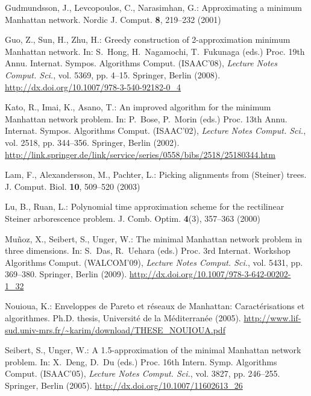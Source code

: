 \documentclass[11pt]{llncs}
\begin{document}
\begin{thebibliography}{10}
Gudmundsson, J., Levcopoulos, C., Narasimhan, G.: Approximating a minimum
  {Manhattan} network.
\newblock Nordic J. Comput. \textbf{8}, 219--232 (2001)

Guo, Z., Sun, H., Zhu, H.: Greedy construction of 2-approximation minimum
  {Manhattan} network.
\newblock In: S.~Hong, H.~Nagamochi, T.~Fukunaga (eds.) Proc. 19th Annu.
  Internat. Sympos. Algorithms Comput. (ISAAC'08), \emph{Lecture Notes Comput.
  Sci.}, vol. 5369, pp. 4--15. Springer, Berlin (2008).
\newblock \urlprefix\url{http://dx.doi.org/10.1007/978-3-540-92182-0_4}

Kato, R., Imai, K., Asano, T.: An improved algorithm for the minimum
  {Manhattan} network problem.
\newblock In: P.~Bose, P.~Morin (eds.) Proc. 13th Annu. Internat. Sympos.
  Algorithms Comput. (ISAAC'02), \emph{Lecture Notes Comput. Sci.}, vol. 2518,
  pp. 344--356. Springer, Berlin (2002).
\newblock
  \urlprefix\url{http://link.springer.de/link/service/series/0558/bibs/2518/25180344.htm}

Lam, F., Alexandersson, M., Pachter, L.: Picking alignments from ({Steiner})
  trees.
\newblock J. Comput. Biol. \textbf{10}, 509--520 (2003)

Lu, B., Ruan, L.: Polynomial time approximation scheme for the rectilinear
  {Steiner} arborescence problem.
\newblock J. Comb. Optim. \textbf{4}(3), 357--363 (2000)

Mu{\~n}oz, X., Seibert, S., Unger, W.: The minimal {Manhattan} network problem
  in three dimensions.
\newblock In: S.~Das, R.~Uehara (eds.) Proc. 3rd Internat. Workshop Algorithms
  Comput. (WALCOM'09), \emph{Lecture Notes Comput. Sci.}, vol. 5431, pp.
  369--380. Springer, Berlin (2009).
\newblock \urlprefix\url{http://dx.doi.org/10.1007/978-3-642-00202-1_32}

Nouioua, K.: Enveloppes de {Pareto} et r{\'e}seaux de {Manhattan}:
  Caract{\'e}risations et algorithmes.
\newblock Ph.D. thesis, Universit{\'e} de la M{\'e}diterran{\'e}e (2005).
\newblock
  \urlprefix\url{http://www.lif-sud.univ-mrs.fr/~karim/download/THESE_NOUIOUA.pdf}

Seibert, S., Unger, W.: A 1.5-approximation of the minimal {Manhattan} network
  problem.
\newblock In: X.~Deng, D.~Du (eds.) Proc. 16th Intern. Symp. Algorithms Comput.
  (ISAAC'05), \emph{Lecture Notes Comput. Sci.}, vol. 3827, pp. 246--255.
  Springer, Berlin (2005).
\newblock \urlprefix\url{http://dx.doi.org/10.1007/11602613_26}


\end{thebibliography}
\end{document}
